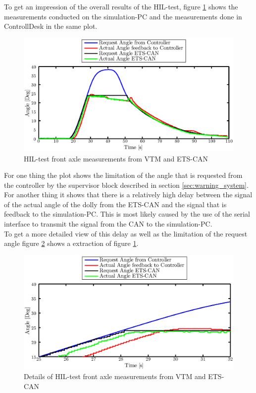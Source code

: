 \documentclass[ExampleMasters.tex]{subfiles}
\begin{document}
To get an impression of the overall results of the \gls{HIL}-test, figure \ref{fig:HIL002_complete} shows the measurements conducted on the simulation-PC and the measurements done in ControllDesk in the same plot. 
\begin{figure}[!htb]
	\centering
	\includegraphics[width=1\linewidth]{figures/HIL006_alles}
	\caption{HIL-test front axle measurements from VTM and ETS-CAN}	
	\label{fig:HIL002_complete}
\end{figure}

For one thing the plot shows the limitation of the angle that is requested from the controller by the supervisor block described in section \ref{sec:warning_system}. For another thing it shows that there is a relatively high delay between the signal of the actual angle of the dolly from the \gls{ETS}-\gls{CAN} and the signal that is feedback to the simulation-PC. This is most likely caused by the use of the serial interface to transmit the signal from the CAN to the simulation-PC. \\
To get a more detailed view of this delay as well as the limitation of the request angle figure \ref{fig:HIL002_complete_details} shows a extraction of figure \ref{fig:HIL002_complete}.   

\begin{figure}[!htb]
	\centering
	\includegraphics[width=1\linewidth]{figures/HIL006_alles_details}
	\caption{Details of \gls{HIL}-test front axle measurements from \gls{VTM} and \gls{ETS}-\gls{CAN}}
	
	\label{fig:HIL002_complete_details}
\end{figure}
\end{document}
